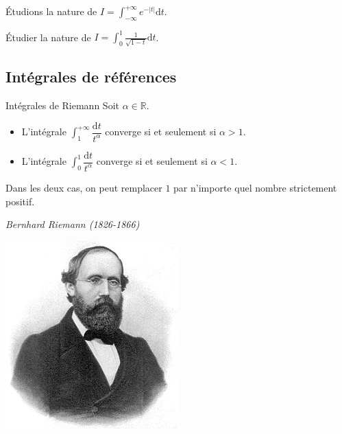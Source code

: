 \documentclass[french,11pt,twoside]{VcCours}
\newcommand{\dt}{\text{d}t}
\begin{document}
\begin{Exemple} Étudions la nature de $I=\int_{- \infty}^{+ \infty} e^{-\vert t \vert} \dt$.

	\vspace*{5cm}

\end{Exemple}
\begin{ApplicationDirecte}{} Étudier la nature de $ I= \int_{0}^1 \frac{1}{\sqrt{1-t}} \dt$.
\end{ApplicationDirecte} 

\subsection{Intégrales de références}

\begin{Proposition}{Intégrales de Riemann}
Soit $\alpha \in \mathbb{R}$.
\begin{itemize}
\item L'intégrale $\int_{1}^{+ \infty} \dfrac{\dt}{t^{\alpha}}$ converge si et seulement si $\alpha>1$.
\item L'intégrale $\int_{0}^{1} \dfrac{\dt}{t^{\alpha}}$ converge si et seulement si $\alpha<1$.
\end{itemize}
\end{Proposition} 

\begin{Remarque}{} Dans les deux cas, on peut remplacer $1$ par n'importe quel nombre strictement positif.
\end{Remarque}

\begin{center}
\emph{Bernhard Riemann (1826-1866)}

\includegraphics[scale=0.4]{Riemann}
\end{center}
\end{document}
